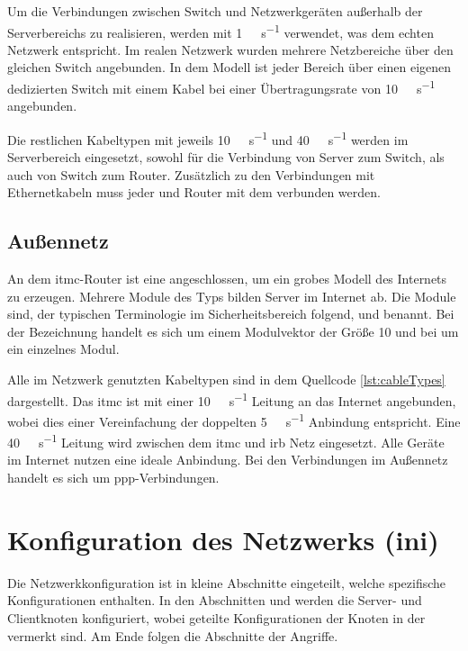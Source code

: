Um die Verbindungen zwischen Switch und Netzwerkgeräten außerhalb der Serverbereichs zu realisieren, werden  mit \SI{1}{\giga\bit\per\second} verwendet, was dem echten Netzwerk entspricht. Im realen Netzwerk wurden mehrere Netzbereiche über den gleichen Switch angebunden. In dem Modell ist jeder Bereich über einen eigenen dedizierten Switch mit einem Kabel  bei einer Übertragungsrate von \SI{10}{\giga\bit\per\second} angebunden.

Die restlichen Kabeltypen mit jeweils \SI{10}{\giga\bit\per\second} und  \SI{40}{\giga\bit\per\second} werden im Serverbereich eingesetzt, sowohl für die Verbindung von Server zum Switch, als auch von Switch zum Router. Zusätzlich zu den Verbindungen mit Ethernetkabeln muss jeder  und Router mit dem  verbunden werden. 

\subsection{Außennetz}
An dem \gls{itmc}-Router ist eine  angeschlossen, um ein grobes Modell des Internets zu erzeugen. Mehrere Module des Typs  bilden Server im Internet ab. Die Module sind, der typischen Terminologie im Sicherheitsbereich folgend,  und  benannt. Bei der Bezeichnung  handelt es sich um einem Modulvektor der Größe 10 und bei  um ein einzelnes Modul.

Alle im Netzwerk genutzten Kabeltypen sind in dem Quellcode \ref{lst:cableTypes} dargestellt.
Das \gls{itmc} ist mit einer \SI{10}{\giga\bit\per\second} Leitung an das Internet angebunden, wobei dies einer Vereinfachung der doppelten \SI{5}{\giga\bit\per\second} Anbindung entspricht. Eine \SI{40}{\giga\bit\per\second} Leitung wird zwischen dem \gls{itmc} und \gls{irb} Netz eingesetzt. Alle Geräte im Internet nutzen eine ideale Anbindung. Bei den Verbindungen im Außennetz handelt es sich um \gls{ppp}-Verbindungen. 

\section{Konfiguration des Netzwerks (ini)}
Die Netzwerkkonfiguration  ist in kleine Abschnitte eingeteilt, welche spezifische Konfigurationen enthalten. In den Abschnitten \ini{[ServerConfig]} und \ini{[ClientConfig]} werden die Server- und Clientknoten konfiguriert, wobei geteilte Konfigurationen der Knoten in der \ini{[NodeConfig]} vermerkt sind. Am Ende folgen die Abschnitte der Angriffe.

